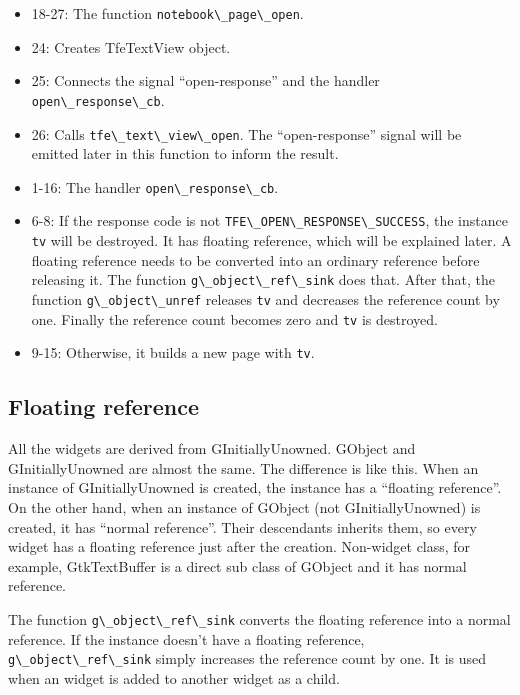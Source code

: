 \begin{itemize}
\tightlist
\item
  18-27: The function \passthrough{\lstinline!notebook\_page\_open!}.
\item
  24: Creates TfeTextView object.
\item
  25: Connects the signal ``open-response'' and the handler
  \passthrough{\lstinline!open\_response\_cb!}.
\item
  26: Calls \passthrough{\lstinline!tfe\_text\_view\_open!}. The
  ``open-response'' signal will be emitted later in this function to
  inform the result.
\item
  1-16: The handler \passthrough{\lstinline!open\_response\_cb!}.
\item
  6-8: If the response code is not
  \passthrough{\lstinline!TFE\_OPEN\_RESPONSE\_SUCCESS!}, the instance
  \passthrough{\lstinline!tv!} will be destroyed. It has floating
  reference, which will be explained later. A floating reference needs
  to be converted into an ordinary reference before releasing it. The
  function \passthrough{\lstinline!g\_object\_ref\_sink!} does that.
  After that, the function \passthrough{\lstinline!g\_object\_unref!}
  releases \passthrough{\lstinline!tv!} and decreases the reference
  count by one. Finally the reference count becomes zero and
  \passthrough{\lstinline!tv!} is destroyed.
\item
  9-15: Otherwise, it builds a new page with
  \passthrough{\lstinline!tv!}.
\end{itemize}

\subsection{Floating reference}\label{floating-reference}

All the widgets are derived from GInitiallyUnowned. GObject and
GInitiallyUnowned are almost the same. The difference is like this. When
an instance of GInitiallyUnowned is created, the instance has a
``floating reference''. On the other hand, when an instance of GObject
(not GInitiallyUnowned) is created, it has ``normal reference''. Their
descendants inherits them, so every widget has a floating reference just
after the creation. Non-widget class, for example, GtkTextBuffer is a
direct sub class of GObject and it has normal reference.

The function \passthrough{\lstinline!g\_object\_ref\_sink!} converts the
floating reference into a normal reference. If the instance doesn't have
a floating reference, \passthrough{\lstinline!g\_object\_ref\_sink!}
simply increases the reference count by one. It is used when an widget
is added to another widget as a child.

